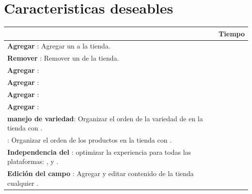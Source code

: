 \section{Caracteristicas deseables}\label{cap:intro:alcance}

\begin{table}[h!]
    \tiny
   
\begin{tabular}{ |L{0.6\paperwidth}|L{0.1\paperwidth}|}
\hline
	\task &
	Tiempo
	
\\ \hline
	\textbf{ Agregar \itemCOM}: Agregar un \itemCOM a la tienda.&
	
\\ \hline
	\textbf{ Remover \itemCOM}: Remover un \itemCOM de la tienda.&
	
\\ \hline
	\textbf{ Agregar \itemCOM}: &
	
\\ \hline
	\textbf{ Agregar \itemCOM}: &
	
\\ \hline
	\textbf{ Agregar \itemCOM}: &
	
\\ \hline
	\textbf{ Agregar \itemCOM}: &
	
\\ \hline
	\textbf{ \textit{\dragdrop} manejo de variedad}: Organizar el orden de la variedad de \itemCOM en la tienda con \textit{\dragdrop}.&
		
\\ \hline
	\textbf{ \dragdrop \merchandising}: Organizar el orden de los productos en la tienda con \textit{\dragdrop}.&
		
\\ \hline
	\textbf{Independencia del \device}: optimizar la experiencia para todas las plataformas: \mobile, \tablet y \desktop \devices.
		
\\ \hline
	 \textbf{Edición del campo \inline}: Agregar y editar contenido de la tienda \clicking cualquier \textfield.&
		

\end{tabular}
\end{table}
